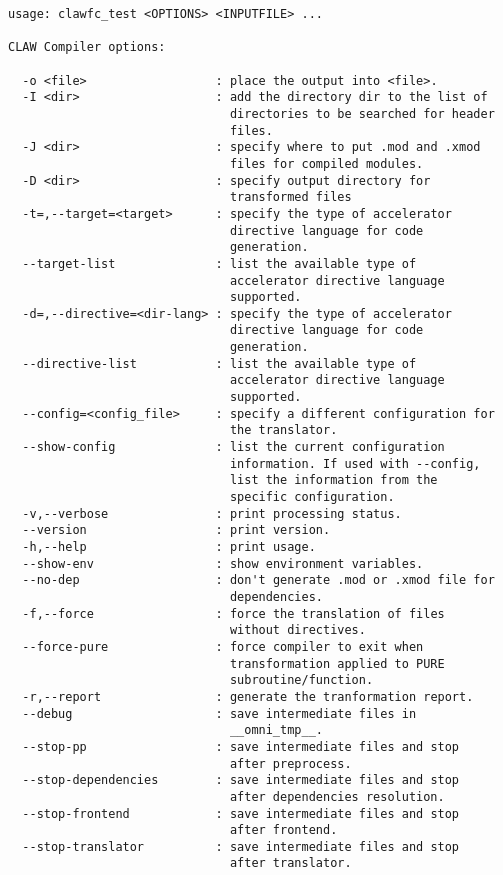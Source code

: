 \documentclass{article}
\begin{document}
\begin{lstlisting}
usage: clawfc_test <OPTIONS> <INPUTFILE> ...

CLAW Compiler options:

  -o <file>                  : place the output into <file>.
  -I <dir>                   : add the directory dir to the list of
                               directories to be searched for header
                               files.
  -J <dir>                   : specify where to put .mod and .xmod
                               files for compiled modules.
  -D <dir>                   : specify output directory for
                               transformed files
  -t=,--target=<target>      : specify the type of accelerator
                               directive language for code
                               generation.
  --target-list              : list the available type of
                               accelerator directive language
                               supported.
  -d=,--directive=<dir-lang> : specify the type of accelerator
                               directive language for code
                               generation.
  --directive-list           : list the available type of
                               accelerator directive language
                               supported.
  --config=<config_file>     : specify a different configuration for
                               the translator.
  --show-config              : list the current configuration
                               information. If used with --config,
                               list the information from the
                               specific configuration.
  -v,--verbose               : print processing status.
  --version                  : print version.
  -h,--help                  : print usage.
  --show-env                 : show environment variables.
  --no-dep                   : don't generate .mod or .xmod file for
                               dependencies.
  -f,--force                 : force the translation of files
                               without directives.
  --force-pure               : force compiler to exit when
                               transformation applied to PURE
                               subroutine/function.
  -r,--report                : generate the tranformation report.
  --debug                    : save intermediate files in
                               __omni_tmp__.
  --stop-pp                  : save intermediate files and stop
                               after preprocess.
  --stop-dependencies        : save intermediate files and stop
                               after dependencies resolution.
  --stop-frontend            : save intermediate files and stop
                               after frontend.
  --stop-translator          : save intermediate files and stop
                               after translator.


\end{lstlisting}
\end{document}
